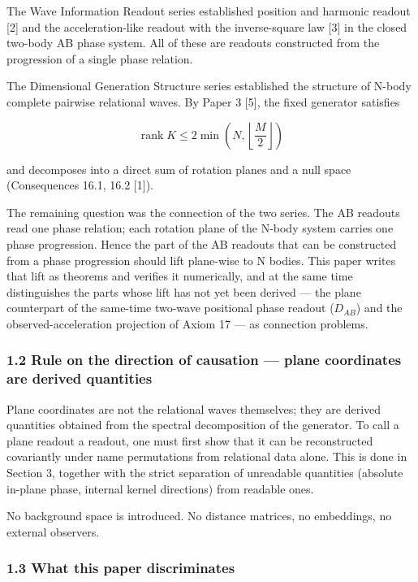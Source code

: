\documentclass[
  a4paper,
]{article}
\begin{document}
The Wave Information Readout series established position and harmonic
readout {[}2{]} and the acceleration-like readout with the
inverse-square law {[}3{]} in the closed two-body AB phase system. All
of these are readouts constructed from the progression of a single phase
relation.

The Dimensional Generation Structure series established the structure of
N-body complete pairwise relational waves. By Paper 3 {[}5{]}, the fixed
generator satisfies

\[
\operatorname{rank}K\le2\min\!\left(N,\left\lfloor\frac{M}{2}\right\rfloor\right)
\]

and decomposes into a direct sum of rotation planes and a null space
(Consequences 16.1, 16.2 {[}1{]}).

The remaining question was the connection of the two series. The AB
readouts read one phase relation; each rotation plane of the N-body
system carries one phase progression. Hence the part of the AB readouts
that can be constructed from a phase progression should lift plane-wise
to N bodies. This paper writes that lift as theorems and verifies it
numerically, and at the same time distinguishes the parts whose lift has
not yet been derived --- the plane counterpart of the same-time two-wave
positional phase readout (\(D_{AB}\)) and the observed-acceleration
projection of Axiom 17 --- as connection problems.

\subsubsection{1.2 Rule on the direction of causation --- plane
coordinates are derived
quantities}\label{rule-on-the-direction-of-causation-plane-coordinates-are-derived-quantities}

Plane coordinates are not the relational waves themselves; they are
derived quantities obtained from the spectral decomposition of the
generator. To call a plane readout a readout, one must first show that
it can be reconstructed covariantly under name permutations from
relational data alone. This is done in Section 3, together with the
strict separation of unreadable quantities (absolute in-plane phase,
internal kernel directions) from readable ones.

No background space is introduced. No distance matrices, no embeddings,
no external observers.

\subsubsection{1.3 What this paper
discriminates}\label{what-this-paper-discriminates}
\end{document}
